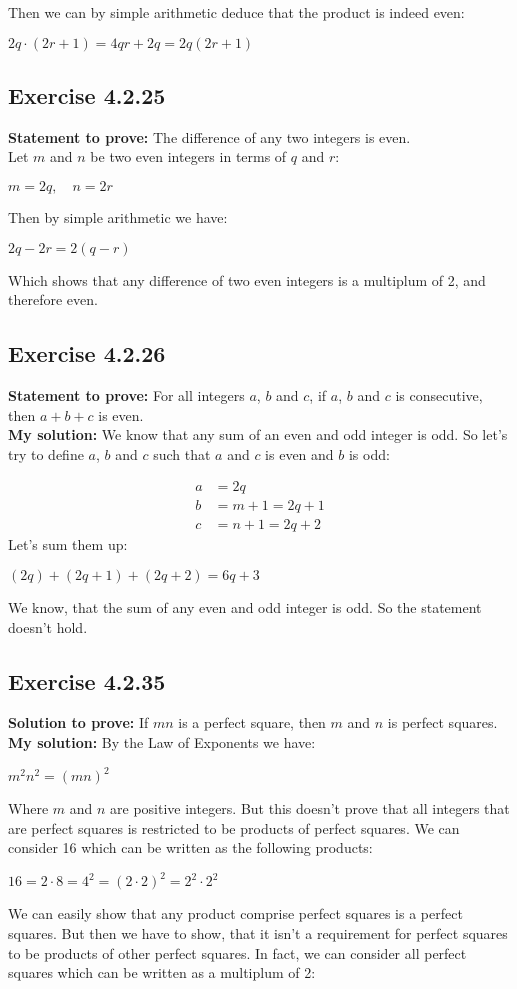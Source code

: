 \documentclass{report}
\newcommand{\cent}[1]{\begin{center}#1\end{center}}
\newcommand{\mAlign}[1]{\begin{align*}#1\end{align*}}
\newcommand{\Prove}{\textbf{Statement to prove: }}
\newcommand{\solution}{\textbf{My solution: }}
\newcommand{\QED}{\boxed{}}
\newcommand{\Exercise}[1]{\subsection{Exercise #1}}
\begin{document}
	Then we can by simple arithmetic deduce that the product is indeed even:
	
	\cent{$ 2q \cdot (2r+1) = 4qr+2q = 2q(2r+1) $}
	
	\QED
	
	\Exercise{4.2.25}
	
	\Prove
	The difference of any two integers is even.\\
	
	Let $m$ and $n$ be two even integers in terms of $q$ and $r$: 
	
	\cent{$m = 2q, \quad n = 2r$}
	
	Then by simple arithmetic we have:
	\cent{$2q - 2r = 2(q-r)$}
	
	Which shows that any difference of two even integers is a multiplum of 2, and therefore even.
	\QED
	
	\Exercise{4.2.26}
	\Prove
	For all integers $a$, $b$ and $c$, if $a$, $b$ and $c$ is consecutive, then $a+b+c$ is even.\\
	
	\solution
	We know that any sum of an even and odd integer is odd. So let's try to define $a$, $b$ and $c$ such that $a$ and $c$ is even and $b$ is odd:
	
	\mAlign{a &= 2q\\
					b &= m + 1 = 2q+1 \\
					c &= n + 1 = 2q+2}
	Let's sum them up:
	
	\cent{$(2q) + (2q+1) + (2q+2) = 6q+3$}
	
	We know, that the sum of any even and odd integer is odd. So the statement doesn't hold.
	
	\QED
	
	\Exercise{4.2.35}
	\textbf{Solution to prove:}
	If $mn$ is a perfect square, then $m$ and $n$ is perfect squares.\\
	
	\solution
	By the Law of Exponents we have:
	\cent{$ m^2 n^2=(mn)^2$}
	
	Where $m$ and $n$ are positive integers. But this doesn't prove that all integers that are perfect squares is restricted to be products of perfect squares. We can consider 16 which can be written as the following products:
	
	\cent{$16 = 2 \cdot 8 = 4^2 = (2 \cdot 2)^2 = 2^2 \cdot 2^2$}
	
	We can easily show that any product comprise perfect squares is a perfect squares. But then we have to show, that it isn't a requirement for perfect squares to be products of other perfect squares. In fact, we can consider all perfect squares which can be written as a multiplum of 2:
	
\end{document}
